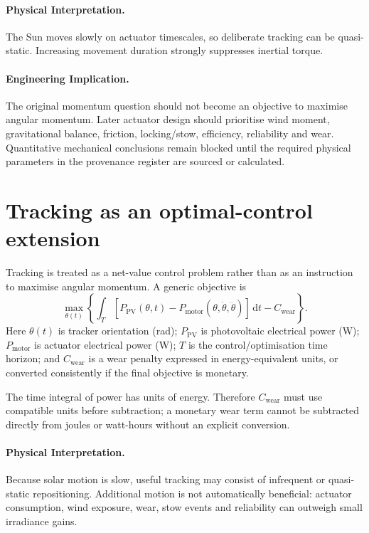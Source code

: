 \documentclass[11pt,a4paper]{article}
\begin{document}
\paragraph{Physical Interpretation.}
The Sun moves slowly on actuator timescales, so deliberate tracking can be quasi-static. Increasing movement duration strongly suppresses inertial torque.

\paragraph{Engineering Implication.}
The original momentum question should not become an objective to maximise angular momentum. Later actuator design should prioritise wind moment, gravitational balance, friction, locking/stow, efficiency, reliability and wear. Quantitative mechanical conclusions remain blocked until the required physical parameters in the provenance register are sourced or calculated.

\section{Tracking as an optimal-control extension}
Tracking is treated as a net-value control problem rather than as an instruction to maximise angular momentum. A generic objective is
\begin{equation}
\max_{\theta(t)}
\left\{
\int_T
\left[
P_{\mathrm{PV}}(\theta,t)
-
P_{\mathrm{motor}}(\theta,\dot\theta,\ddot\theta)
\right]\,\mathrm dt
-
C_{\mathrm{wear}}
\right\}.
\label{eq:tracking-control}
\end{equation}
Here \(\theta(t)\) is tracker orientation (rad); \(P_{\mathrm{PV}}\) is photovoltaic electrical power (W); \(P_{\mathrm{motor}}\) is actuator electrical power (W); \(T\) is the control/optimisation time horizon; and \(C_{\mathrm{wear}}\) is a wear penalty expressed in energy-equivalent units, or converted consistently if the final objective is monetary.

The time integral of power has units of energy. Therefore \(C_{\mathrm{wear}}\) must use compatible units before subtraction; a monetary wear term cannot be subtracted directly from joules or watt-hours without an explicit conversion.

\paragraph{Physical Interpretation.}
Because solar motion is slow, useful tracking may consist of infrequent or quasi-static repositioning. Additional motion is not automatically beneficial: actuator consumption, wind exposure, wear, stow events and reliability can outweigh small irradiance gains.
\end{document}
